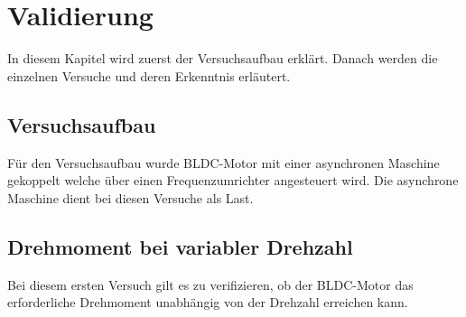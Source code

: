 \section{Validierung}
In diesem Kapitel wird zuerst der Versuchsaufbau erklärt. Danach werden die einzelnen Versuche und deren Erkenntnis erläutert.

\subsection{Versuchsaufbau}
Für den Versuchsaufbau wurde BLDC-Motor mit einer asynchronen Maschine gekoppelt welche über einen Frequenzumrichter angesteuert wird. Die asynchrone Maschine dient bei diesen Versuche als Last.


\subsection{Drehmoment bei variabler Drehzahl}
Bei diesem ersten Versuch gilt es zu verifizieren, ob der BLDC-Motor das erforderliche Drehmoment unabhängig von der Drehzahl erreichen kann.